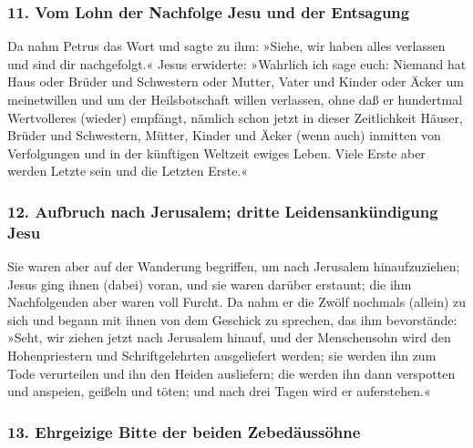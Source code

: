\hypertarget{vom-lohn-der-nachfolge-jesu-und-der-entsagung}{%
\subsubsection{11. Vom Lohn der Nachfolge Jesu und der
Entsagung}\label{vom-lohn-der-nachfolge-jesu-und-der-entsagung}}

 Da nahm Petrus das Wort und sagte zu ihm: »Siehe, wir
haben alles verlassen und sind dir nachgefolgt.«  Jesus
erwiderte: »Wahrlich ich sage euch: Niemand hat Haus oder Brüder und
Schwestern oder Mutter, Vater und Kinder oder Äcker um meinetwillen und
um der Heilsbotschaft willen verlassen,  ohne daß er
hundertmal Wertvolleres (wieder) empfängt, nämlich schon jetzt in dieser
Zeitlichkeit Häuser, Brüder und Schwestern, Mütter, Kinder und Äcker
(wenn auch) inmitten von Verfolgungen und in der künftigen Weltzeit
ewiges Leben.  Viele Erste aber werden Letzte sein und
die Letzten Erste.«

\hypertarget{aufbruch-nach-jerusalem-dritte-leidensankuxfcndigung-jesu}{%
\subsubsection{12. Aufbruch nach Jerusalem; dritte Leidensankündigung
Jesu}\label{aufbruch-nach-jerusalem-dritte-leidensankuxfcndigung-jesu}}

 Sie waren aber auf der Wanderung begriffen, um nach
Jerusalem hinaufzuziehen; Jesus ging ihnen (dabei) voran, und sie waren
darüber erstaunt; die ihm Nachfolgenden aber waren voll Furcht. Da nahm
er die Zwölf nochmals (allein) zu sich und begann mit ihnen von dem
Geschick zu sprechen, das ihm bevorstände:  »Seht, wir
ziehen jetzt nach Jerusalem hinauf, und der Menschensohn wird den
Hohenpriestern und Schriftgelehrten ausgeliefert werden; sie werden ihn
zum Tode verurteilen und ihn den Heiden ausliefern;  die
werden ihn dann verspotten und anspeien, geißeln und töten; und nach
drei Tagen wird er auferstehen.«

\hypertarget{ehrgeizige-bitte-der-beiden-zebeduxe4ussuxf6hne}{%
\subsubsection{13. Ehrgeizige Bitte der beiden
Zebedäussöhne}\label{ehrgeizige-bitte-der-beiden-zebeduxe4ussuxf6hne}}

